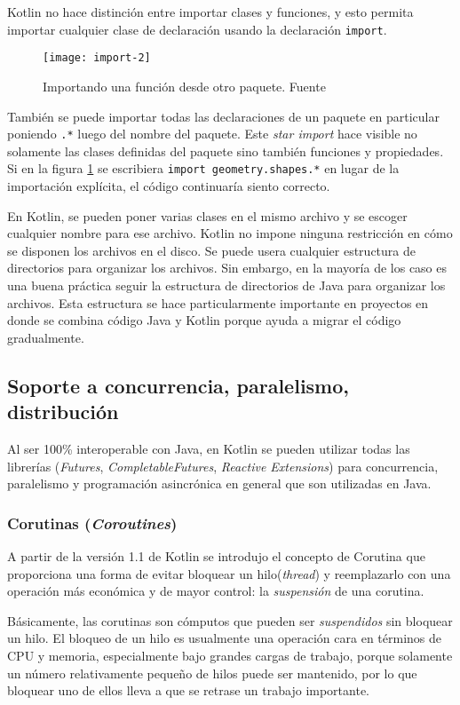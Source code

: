 Kotlin no hace distinción entre importar clases y funciones, y esto permita importar cualquier clase de declaración usando la declaración \texttt{import}.

\begin{figure}[h!]
  \texttt{[image: import-2]}
  \caption{Importando una función desde otro paquete. Fuente \cite{kotlin-in-action}}
  \label{fig:import-2}
\end{figure}

También se puede importar todas las declaraciones de un paquete en particular poniendo \texttt{.*} luego del nombre del paquete. Este \emph{star import} hace visible no solamente las clases definidas del paquete sino también funciones y propiedades. Si en la figura \ref{fig:import-2} se escribiera \texttt{import geometry.shapes.*} en lugar de la importación explícita, el código continuaría siento correcto.

En Kotlin, se pueden poner varias clases en el mismo archivo y se escoger cualquier nombre para ese archivo. Kotlin no impone ninguna restricción en cómo se disponen los archivos en el disco. Se puede usera cualquier estructura de directorios para organizar los archivos. Sin embargo, en la mayoría de los caso es una buena práctica seguir la estructura de directorios de Java para organizar los archivos. Esta estructura se hace particularmente importante en proyectos en donde se combina código Java y Kotlin porque ayuda a migrar el código gradualmente.

\subsection{Soporte a concurrencia, paralelismo, distribución}
Al ser 100\% interoperable con Java, en Kotlin se pueden utilizar todas las librerías (\emph{Futures}, \emph{CompletableFutures}, \emph{Reactive Extensions}) para concurrencia, paralelismo y programación asincrónica en general que son utilizadas en Java.

\subsubsection{Corutinas (\emph{Coroutines})}
A partir de la versión 1.1 de Kotlin se introdujo el concepto de Corutina que proporciona una forma de evitar bloquear un hilo(\emph{thread}) y reemplazarlo con una operación más económica y de mayor control: la \emph{suspensión} de una corutina.

Básicamente, las corutinas son cómputos que pueden ser \emph{suspendidos} sin bloquear un hilo. El bloqueo de un hilo es usualmente una operación cara en términos de CPU y memoria, especialmente bajo grandes cargas de trabajo, porque solamente un número relativamente pequeño de hilos puede ser mantenido, por lo que bloquear uno de ellos lleva a que se retrase un trabajo importante.

